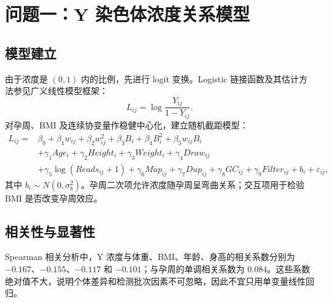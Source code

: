 \documentclass[UTF8,a4paper,12pt]{ctexart}
\begin{document}
\section{问题一：Y 染色体浓度关系模型}

\subsection{模型建立}

由于浓度是 $(0,1)$ 内的比例，先进行 logit 变换。Logistic 链接函数及其估计方法参见广义线性模型框架\cite{McCullagh1989,Hosmer2013}：
\begin{equation}
  L_{ij}=\log\frac{Y_{ij}}{1-Y_{ij}}.
\end{equation}
对孕周、BMI 及连续协变量作稳健中心化，建立随机截距模型：
\begin{equation}
\begin{aligned}
L_{ij}={}&\beta_0+\beta_1 w_{ij}+\beta_2 w_{ij}^2+\beta_3 B_i+\beta_4 B_i^2+\beta_5w_{ij}B_i\\
&+\gamma_1 Age_i+\gamma_2 Height_i+\gamma_3 Weight_i+\gamma_4 Draw_{ij}\\
&+\gamma_5\log(Reads_{ij}+1)+\gamma_6 Map_{ij}+\gamma_7 Dup_{ij}+\gamma_8GC_{ij}+\gamma_9Filter_{ij}+b_i+\varepsilon_{ij},
\end{aligned}
\end{equation}
其中 $b_i\sim N(0,\sigma_b^2)$。孕周二次项允许浓度随孕周呈弯曲关系；交互项用于检验 BMI 是否改变孕周效应。

\subsection{相关性与显著性}

Spearman 相关分析中，Y 浓度与体重、BMI、年龄、身高的相关系数分别为 $-0.167$、$-0.155$、$-0.117$ 和 $-0.101$；与孕周的单调相关系数为 $0.084$。这些系数绝对值不大，说明个体差异和检测批次因素不可忽略，因此不宜只用单变量线性回归。

\begin{table}[H]
\centering
\caption{问题一模型的主要参数与显著性}
\end{table}
\end{document}
